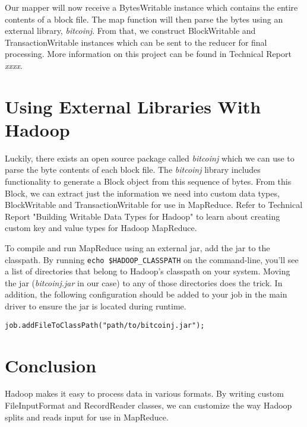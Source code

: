 \documentclass[9pt,twocolumn,twoside]{idsi}
\begin{document}
Our mapper will now receive a BytesWritable instance which contains the entire contents of a block file. The map function will then parse the bytes using an external library, \emph{bitcoinj}. From that, we construct BlockWritable and TransactionWritable instances which can be sent to the reducer for final processing. More information on this project can be found in Technical Report \emph{xxxx}.

\section{Using External Libraries With Hadoop}

Luckily, there exists an open source package called \emph{bitcoinj} which we can use to parse the byte contents of each block file. The \emph{bitcoinj} library includes functionality to generate a Block object from this sequence of bytes. From this Block, we can extract just the information we need into custom data types, BlockWritable and TransactionWritable for use in MapReduce. Refer to Technical Report "Building Writable Data Types for Hadoop" to learn about creating custom key and value types for Hadoop MapReduce.

To compile and run MapReduce using an external jar, add the jar to the classpath. By running \lstinline{echo $HADOOP_CLASSPATH} on the command-line, you'll see a list of directories that belong to Hadoop's classpath on your system. Moving the jar (\emph{bitcoinj.jar} in our case) to any of those directories does the trick. In addition, the following configuration should be added to your job in the main driver to ensure the jar is located during runtime.

\begin{lstlisting}
job.addFileToClassPath("path/to/bitcoinj.jar");
\end{lstlisting}

\section{Conclusion}
Hadoop makes it easy to process data in various formats. By writing custom FileInputFormat and RecordReader classes, we can customize the way Hadoop splits and reads input for use in MapReduce.
\end{document}
